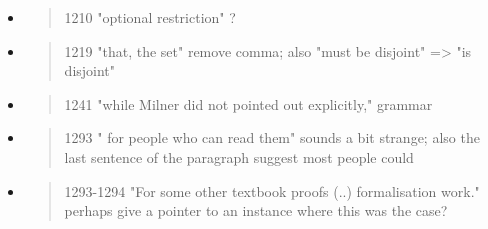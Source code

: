 \begin{itemize}
  \item \begin{quote}
1210 "optional restriction" ?
\end{quote}
  \Mark

  \item \begin{quote}
1219 "that, the set" remove comma; also "must be disjoint" => "is disjoint"
\end{quote}
  \Mark

  \item \begin{quote}
1241 "while Milner did not pointed out explicitly," grammar
\end{quote}
  \Mark

  \item \begin{quote}
1293 " for people who can read them" sounds a bit strange; also the last sentence of the paragraph suggest most people could
\end{quote}
  \Mark

  \item \begin{quote}
1293-1294 "For some other textbook proofs (..) formalisation work." perhaps give a pointer to an instance where this was the case?
\end{quote}
  \Mark

\end{itemize} 
